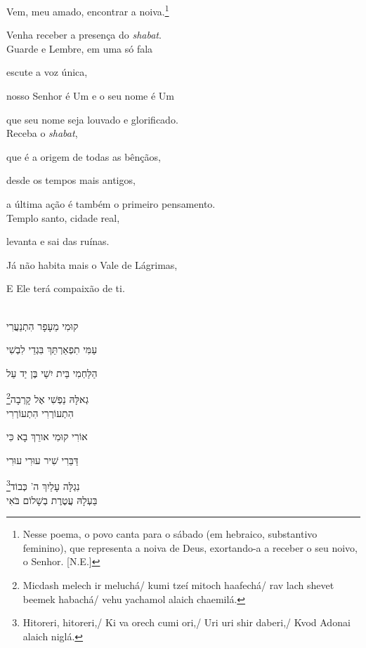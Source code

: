Vem, {meu amado}, encontrar a noiva.\label{casamento}\footnote{Nesse poema, o povo canta para 
	o sábado (em hebraico, substantivo feminino), 
	que representa a noiva de Deus,
	exortando-a a receber o seu noivo, o Senhor. [N.E.]}


Venha receber a presença do \emph{shabat}.\\[10pt]

{Guarde e Lembre}, em uma só fala

escute a voz única,

nosso Senhor é Um e o seu nome é Um

que seu nome seja louvado e glorificado.\\[10pt]

Receba o \emph{shabat},

que é a origem de todas as bênçãos,

desde os tempos mais antigos,

a última ação é também o primeiro pensamento.\\[10pt]

Templo santo, cidade real,

levanta e sai das ruínas.

Já não habita mais o Vale de Lágrimas,

E Ele terá compaixão de ti.\\[10pt]


\movetoevenpage
\raggedleft

\vspace*{1cm}

\textsc{}\\[15pt]

קוּמִי מֵעָפָר הִתְנַעֲרִי

עַמִּי תִפְאַרְתֵּךְ בִּגְדֵי לִבְשִׁי 

הַלַּחְמִי בֵּית יִשַׁי בֶּן יַד עַל

\footnote{Micdash melech ir meluchá/ kumi tzeí mitoch haafechá/ 
		rav lach shevet beemek habachá/ vehu yachamol alaich chaemilá.}גְאלָּהּ נַפְשִׁי אֶל קָרְבָה\\[10pt]

הִתְעוֹרְרִי הִתְעוֹרְרִי

אוֹרִי קוּמִי אורֵךְ בָא כִּי

דַּבֵּרִי שִׁיר עוּרִי עוּרִי

\footnote{Hitoreri, hitoreri,/ Ki va orech cumi ori,/ Uri uri shir daberi,/
Kvod Adonai alaich niglá.}נִגְלָּה עָלַיִךְ ה' כְּבוֹד\\[10pt]

בַּעְלָהּ עֲטֶרֶת בְשָׁלוֹם בֹּאִי

